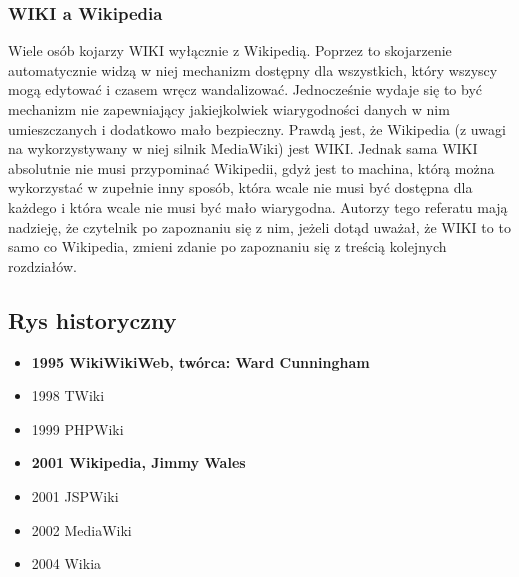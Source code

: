 \documentclass{article}
\begin{document}
	\subsubsection{WIKI a Wikipedia}
	Wiele osób kojarzy WIKI wyłącznie z Wikipedią. Poprzez to skojarzenie automatycznie widzą w niej mechanizm dostępny dla wszystkich, który wszyscy mogą edytować i czasem wręcz wandalizować. Jednocześnie wydaje się to być mechanizm nie zapewniający jakiejkolwiek wiarygodności danych w nim umieszczanych i dodatkowo mało bezpieczny. Prawdą jest, że Wikipedia (z uwagi na wykorzystywany w niej silnik MediaWiki) jest WIKI. Jednak sama WIKI absolutnie nie musi przypominać Wikipedii, gdyż jest to machina, którą można wykorzystać w zupełnie inny sposób, która wcale nie musi być dostępna dla każdego i która wcale nie musi być mało wiarygodna. Autorzy tego referatu mają nadzieję, że czytelnik po zapoznaniu się z nim, jeżeli dotąd uważał, że WIKI to to samo co Wikipedia, zmieni zdanie po zapoznaniu się z treścią kolejnych rozdziałów.
	\subsection{Rys historyczny}


	\begin{itemize}
		\item \textbf{1995 WikiWikiWeb, twórca: Ward Cunningham}
		\item 1998 TWiki
		\item 1999 PHPWiki
		\item \textbf{2001 Wikipedia, Jimmy Wales}
		\item 2001 JSPWiki
		\item 2002 MediaWiki
		\item 2004 Wikia
	\end{itemize}
\end{document}
